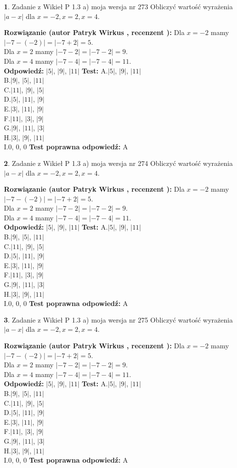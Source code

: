 \documentclass[12pt, a4paper]{article}
\theoremstyle{definition} %
\newtheorem{zad}{}
\newcommand{\zadStart}[1]{\begin{zad}#1\newline}
\newcommand{\zadStop}{\end{zad}}
\newcommand{\rozwStart}[2]{\noindent \textbf{Rozwiązanie (autor #1 , recenzent #2): }\newline}
\newcommand{\rozwStop}{\newline}
\newcommand{\odpStart}{\noindent \textbf{Odpowiedź:}\newline}
\newcommand{\odpStop}{\newline}
\newcommand{\testStart}{\noindent \textbf{Test:}\newline}
\newcommand{\testStop}{\newline}
\newcommand{\kluczStart}{\noindent \textbf{Test poprawna odpowiedź:}\newline}
\newcommand{\kluczStop}{\newline}
\begin{document}
\zadStart{Zadanie z Wikieł P 1.3 a) moja wersja nr 273}
Obliczyć wartość wyrażenia $|a - x|$ dla $x=-2,x=2,x=4$.
\zadStop
\rozwStart{Patryk Wirkus}{}
Dla $x = -2$ mamy $|-7 - (-2)| = |-7 + 2| = 5$.\\
Dla $x = 2$ mamy $|-7 - 2| = |-7 - 2| = 9$.\\
Dla $x = 4$ mamy $|-7 - 4| = |-7 - 4| = 11$.\\
\rozwStop
\odpStart
$|5|$, $|9|$, $|11|$
\odpStop
\testStart
A.$|5|$, $|9|$, $|11|$\\
B.$|9|$, $|5|$, $|11|$\\
C.$|11|$, $|9|$, $|5|$\\
D.$|5|$, $|11|$, $|9|$\\
E.$|3|$, $|11|$, $|9|$\\
F.$|11|$, $|3|$, $|9|$\\
G.$|9|$, $|11|$, $|3|$\\
H.$|3|$, $|9|$, $|11|$\\
I.$0$, $0$, $0$
\testStop
\kluczStart
A
\kluczStop



\zadStart{Zadanie z Wikieł P 1.3 a) moja wersja nr 274}
Obliczyć wartość wyrażenia $|a - x|$ dla $x=-2,x=2,x=4$.
\zadStop
\rozwStart{Patryk Wirkus}{}
Dla $x = -2$ mamy $|-7 - (-2)| = |-7 + 2| = 5$.\\
Dla $x = 2$ mamy $|-7 - 2| = |-7 - 2| = 9$.\\
Dla $x = 4$ mamy $|-7 - 4| = |-7 - 4| = 11$.\\
\rozwStop
\odpStart
$|5|$, $|9|$, $|11|$
\odpStop
\testStart
A.$|5|$, $|9|$, $|11|$\\
B.$|9|$, $|5|$, $|11|$\\
C.$|11|$, $|9|$, $|5|$\\
D.$|5|$, $|11|$, $|9|$\\
E.$|3|$, $|11|$, $|9|$\\
F.$|11|$, $|3|$, $|9|$\\
G.$|9|$, $|11|$, $|3|$\\
H.$|3|$, $|9|$, $|11|$\\
I.$0$, $0$, $0$
\testStop
\kluczStart
A
\kluczStop



\zadStart{Zadanie z Wikieł P 1.3 a) moja wersja nr 275}
Obliczyć wartość wyrażenia $|a - x|$ dla $x=-2,x=2,x=4$.
\zadStop
\rozwStart{Patryk Wirkus}{}
Dla $x = -2$ mamy $|-7 - (-2)| = |-7 + 2| = 5$.\\
Dla $x = 2$ mamy $|-7 - 2| = |-7 - 2| = 9$.\\
Dla $x = 4$ mamy $|-7 - 4| = |-7 - 4| = 11$.\\
\rozwStop
\odpStart
$|5|$, $|9|$, $|11|$
\odpStop
\testStart
A.$|5|$, $|9|$, $|11|$\\
B.$|9|$, $|5|$, $|11|$\\
C.$|11|$, $|9|$, $|5|$\\
D.$|5|$, $|11|$, $|9|$\\
E.$|3|$, $|11|$, $|9|$\\
F.$|11|$, $|3|$, $|9|$\\
G.$|9|$, $|11|$, $|3|$\\
H.$|3|$, $|9|$, $|11|$\\
I.$0$, $0$, $0$
\testStop
\kluczStart
A
\kluczStop
\end{document}
